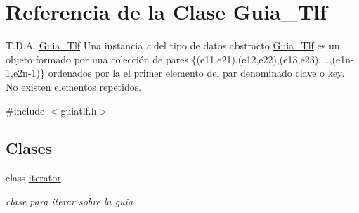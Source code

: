 \hypertarget{classGuia__Tlf}{}\section{Referencia de la Clase Guia\+\_\+\+Tlf}
\label{classGuia__Tlf}


T.\+D.\+A. \hyperlink{classGuia__Tlf}{Guia\+\_\+\+Tlf} Una instancia {\itshape c} del tipo de datos abstracto {\ttfamily \hyperlink{classGuia__Tlf}{Guia\+\_\+\+Tlf}} es un objeto formado por una colección de pares \{(e11,e21),(e12,e22),(e13,e23),...,(e1n-\/1,e2n-\/1)\} ordenados por la el primer elemento del par denominado clave o key. No existen elementos repetidos.  




{\ttfamily \#include $<$guiatlf.\+h$>$}

\subsection*{Clases}
\begin{DoxyCompactItemize}
\item 
class \hyperlink{classGuia__Tlf_1_1iterator}{iterator}
\begin{DoxyCompactList}\small\item\em clase para iterar sobre la guia \end{DoxyCompactList}\end{DoxyCompactItemize}
